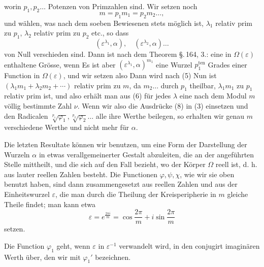 worin $p_1, p_2 \ldots$ Potenzen von  Primzahlen sind.
Wir setzen noch
\[
m = p_1 m_1 = p_2 m_2 \ldots,
\]
und wählen, was nach dem soeben Bewiesenen stets möglich ist,
$\lambda_1$ relativ prim zu $p_1$, $\lambda_2$ relativ prim zu $p_2$ etc., so dass
\[
(\varepsilon^{\lambda_1}, \alpha), \quad (\varepsilon^{\lambda_2}, \alpha) \ldots
\]
von Null verschieden sind. Dann ist nach dem Theorem \S.\,164, 3.:
eine in $\Omega(\varepsilon)$ enthaltene Grösse, wenn
Es ist aber $(\varepsilon^{\lambda_1}, \alpha)^{m_1}$ eine Wurzel $p_1^{\mathrm{ten}}$ Grades einer Function
in $\Omega(\varepsilon)$, und wir setzen also
Dann wird nach (5)
Nun ist $(\lambda_1 m_1 + \lambda_2 m_2 + \cdots)$ relativ prim zu $m$, da $m_2 \ldots$
durch $p_1$ theilbar, $\lambda_1 m_1$ zu $p_1$ relativ prim ist, und also erhält
man aus (6) für jedes $\lambda$ eine nach dem Modul $m$ völlig bestimmte
Zahl $\nu$.
Wenn wir also die Ausdrücke (8) in (3) einsetzen und den
Radicalen $\sqrt[p_1]{\varphi_1}, \sqrt[p_2]{\varphi_2} \ldots$ alle ihre Werthe beilegen, so erhalten
wir genau $m$ verschiedene Werthe und nicht mehr für $\alpha$.

Die letzten Resultate können wir benutzen, um eine Form
der Darstellung der Wurzeln $\alpha$ in etwas verallgemeinerter Gestalt
abzuleiten, die  an der angeführten Stelle mittheilt, und die
sich auf den Fall bezieht, wo der Körper $\Omega$ reell ist, d. h. aus
lauter reellen Zahlen besteht. Die Functionen $\varphi, \psi, \chi$, wie wir
sie oben benutzt haben, sind dann zusammengesetzt aus reellen
Zahlen und aus der Einheitswurzel $\varepsilon$, die man durch die Theilung der Kreisperipherie in $m$ gleiche Theile findet; man kann etwa
\[
\varepsilon = e^{\frac{2\pi i}{m}} = \cos\frac{2\pi}{m} + i \sin\frac{2\pi}{m}
\]
setzen.

Die Function $\varphi_1$ geht, wenn $\varepsilon$ in $\varepsilon^{-1}$ verwandelt wird, in
den conjugirt imaginären Werth über, den wir mit $\varphi_1'$ bezeichnen.
